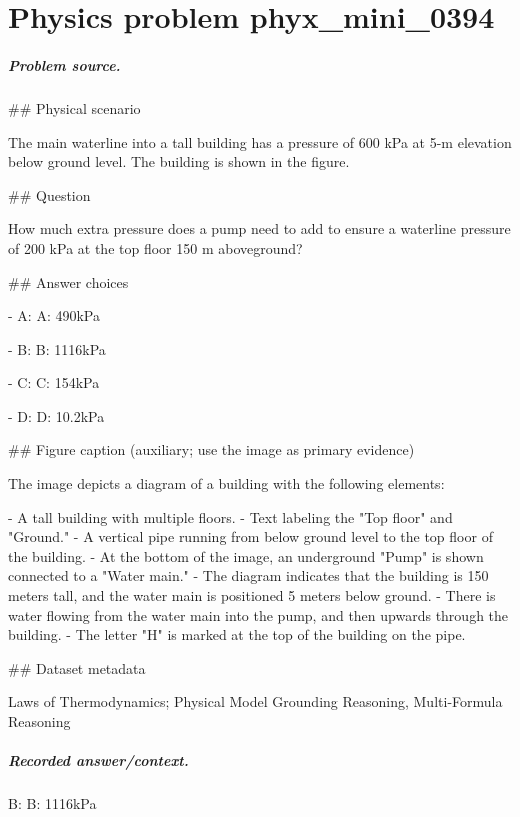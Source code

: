 
\chapter{Physics problem phyx\_mini\_0394}
\label{ch:PhyXMiniProblems_problem_phyx_mini_0394}

\paragraph{Problem source.}
\#\# Physical scenario

The main waterline into a tall building has a pressure of 600 kPa at 5-m elevation below ground level. The building is shown in the figure.

\#\# Question

How much extra pressure does a pump need to add to ensure a waterline pressure of 200 kPa at the top floor 150 m aboveground?

\#\# Answer choices

- A: A: 490kPa

- B: B: 1116kPa

- C: C: 154kPa

- D: D: 10.2kPa

\#\# Figure caption (auxiliary; use the image as primary evidence)

The image depicts a diagram of a building with the following elements:

- A tall building with multiple floors.
- Text labeling the "Top floor" and "Ground."
- A vertical pipe running from below ground level to the top floor of the building.
- At the bottom of the image, an underground "Pump" is shown connected to a "Water main."
- The diagram indicates that the building is 150 meters tall, and the water main is positioned 5 meters below ground.
- There is water flowing from the water main into the pump, and then upwards through the building.
- The letter "H" is marked at the top of the building on the pipe.

\#\# Dataset metadata

Laws of Thermodynamics; Physical Model Grounding Reasoning, Multi-Formula Reasoning

\paragraph{Recorded answer/context.}
B: B: 1116kPa

